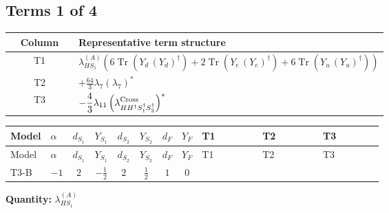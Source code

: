 \documentclass[8pt]{article}
\begin{document}
\begin{landscape}
\subsection*{Terms 1 of 4}
\begin{center}
\begin{tabular}{@{}c >{\raggedright\arraybackslash}p{0.82\linewidth}@{}}
\toprule
Column & Representative term structure \\
\midrule
T1 & \(\displaystyle {\lambda_{HS_1}^{(A)}} (6 \operatorname{Tr}\!\left({Y_d}\,\left({Y_d}\right)^{\dagger}\right)+2 \operatorname{Tr}\!\left({Y_e}\,\left({Y_e}\right)^{\dagger}\right)+6 \operatorname{Tr}\!\left({Y_u}\,\left({Y_u}\right)^{\dagger}\right))\) \\
\midrule
T2 & \(\displaystyle +\frac{64}{3} {\lambda_{7}} \left({\lambda_{7}}\right)^{*}\) \\
\midrule
T3 & \(\displaystyle -\frac{4}{3} {\lambda_{11}} \left({\lambda_{H H^\dagger S_1^\dagger S_2^\dagger}^{\rm Cross}}\right)^{*}\) \\
\midrule
\bottomrule
\end{tabular}
\end{center}
\smallskip
\tiny
\begin{longtable}{@{}llcccccc >{\raggedright\arraybackslash}p{0.21\linewidth} >{\raggedright\arraybackslash}p{0.21\linewidth} >{\raggedright\arraybackslash}p{0.21\linewidth}@{}}
\toprule
Model & $\alpha$ & $d_{S_1}$ & $Y_{S_1}$ & $d_{S_2}$ & $Y_{S_2}$ & $d_F$ & $Y_F$ & T1 & T2 & T3 \\
\midrule
\endfirsthead
\toprule
Model & $\alpha$ & $d_{S_1}$ & $Y_{S_1}$ & $d_{S_2}$ & $Y_{S_2}$ & $d_F$ & $Y_F$ & T1 & T2 & T3 \\
\midrule
\endhead
T3-B & $-1$ & $2$ & $-\frac{1}{2}$ & $2$ & $\frac{1}{2}$ & $1$ & $0$ & \scriptsize\adjustbox{max width=\linewidth}{$\begin{gathered} {\lambda_{HS_1}^{(A)}} (6 \operatorname{Tr}\!\left({Y_d}\,\left({Y_d}\right)^{\dagger}\right)+2 \operatorname{Tr}\!\left({Y_e}\,\left({Y_e}\right)^{\dagger}\right)+6 \operatorname{Tr}\!\left({Y_u}\,\left({Y_u}\right)^{\dagger}\right))\end{gathered}$} & \scriptsize\adjustbox{max width=\linewidth}{$\begin{gathered} +\frac{64}{3} {\lambda_{7}} \left({\lambda_{7}}\right)^{*}\end{gathered}$} & \scriptsize\adjustbox{max width=\linewidth}{$\begin{gathered} -\frac{4}{3} {\lambda_{11}} \left({\lambda_{H H^\dagger S_1^\dagger S_2^\dagger}^{\rm Cross}}\right)^{*}\end{gathered}$} \\
\midrule
\bottomrule
\end{longtable}
\clearpage
\noindent\textbf{Quantity: }$\lambda_{HS_1}^{(A)}$\par\smallskip

\end{landscape}
\end{document}
